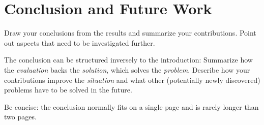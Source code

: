 \chapter{Conclusion and Future Work}
\label{ch:conclusion}

Draw your conclusions from the results and summarize your contributions.
Point out aspects that need to be investigated further.

The conclusion can be structured inversely to the introduction:
Summarize how the \emph{evaluation} backs the \emph{solution}, which solves the \emph{problem}.
Describe how your contributions improve the \emph{situation} and what other (potentially newly discovered) problems have to be solved in the future.

Be concise: the conclusion normally fits on a single page and is rarely longer than two pages.
